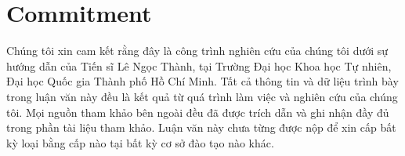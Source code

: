 \chapter*{Commitment}
\label{thanks}
Chúng tôi xin cam kết rằng đây là công trình nghiên cứu của chúng tôi dưới sự hướng dẫn của Tiến sĩ Lê Ngọc Thành, tại Trường Đại học Khoa học Tự nhiên, Đại học Quốc gia Thành phố Hồ Chí Minh. Tất cả thông tin và dữ liệu trình bày trong luận văn này đều là kết quả từ quá trình làm việc và nghiên cứu của chúng tôi. Mọi nguồn tham khảo bên ngoài đều đã được trích dẫn và ghi nhận đầy đủ trong phần tài liệu tham khảo. Luận văn này chưa từng được nộp để xin cấp bất kỳ loại bằng cấp nào tại bất kỳ cơ sở đào tạo nào khác.